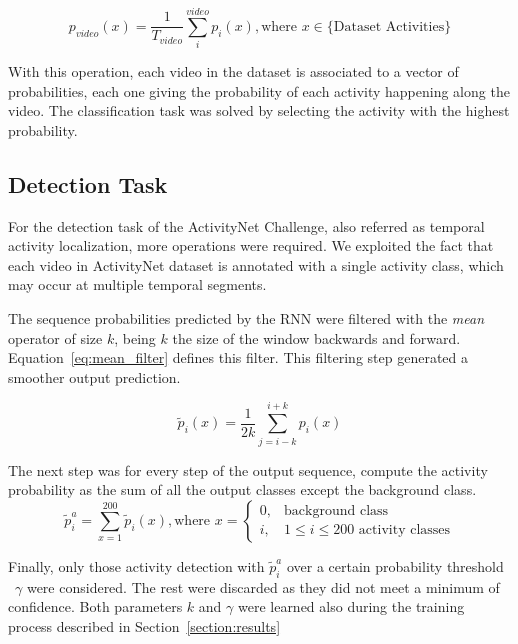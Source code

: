 \begin{equation}
	p_{video}(x) = \frac{1}{T_{video}} \sum_i^{video} p_i(x), \text{where } x \in \{ \text{Dataset Activities}\}
\end{equation}

With this operation, each video in the dataset is associated to a vector of probabilities, each one giving the probability of each activity happening along the video. The classification task was solved by selecting the activity with the highest probability.

\subsection{Detection Task}

For the detection task of the ActivityNet Challenge, also referred as temporal activity localization, more operations were required. We exploited the fact that each video in ActivityNet dataset is annotated with a single activity class, which may occur at multiple temporal segments.

The sequence probabilities predicted by the RNN were filtered with the \textit{mean} operator of size $k$, being $k$ the size of the window backwards and forward. Equation~\ref{eq:mean_filter} defines this filter. This filtering step generated a smoother output prediction.

\begin{equation}
	\tilde{p}_i(x) = \frac{1}{2k} \sum_{j=i-k}^{i+k} p_i(x)
    \label{eq:mean_filter}
\end{equation}

The next step was for every step of the output sequence, compute the activity probability as the sum of all the output classes except the background class.
\begin{equation}
	\tilde{p}^a_i = \sum_{x=1}^{200}\tilde{p}_i(x), \text{where } x = \begin{cases}
        0, & \text{background class} \\
        i, & 1 \leq i \leq 200 \text{ activity classes}
    \end{cases}
\end{equation}

Finally, only those activity detection with $\tilde{p}^a_i$ over a certain probability threshold ~$\gamma$ were considered. The rest were discarded as they did not meet a minimum of confidence. Both parameters $k$ and $\gamma$ were learned also during the training process described in Section~\ref{section:results}

